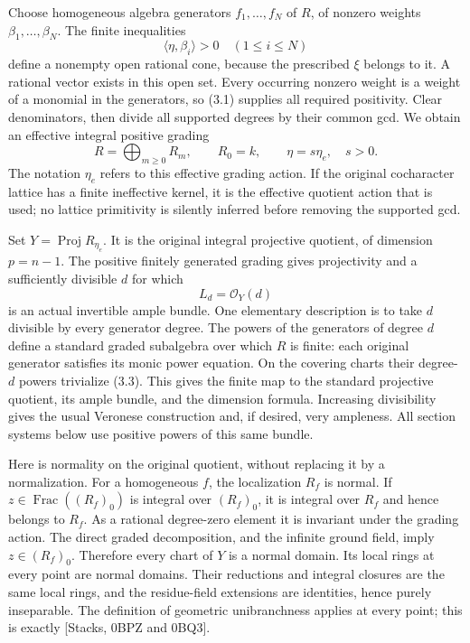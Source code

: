 \documentclass[
  10pt,
]{article}
\begin{document}
Choose homogeneous algebra generators \(f_1,\ldots,f_N\) of \(R\), of
nonzero weights \(\beta_1,\ldots,\beta_N\). The finite inequalities \[
                 \langle\eta,\beta_i\rangle>0\quad(1\leq i\leq N)
                                                               \tag{3.1}
\] define a nonempty open rational cone, because the prescribed \(\xi\)
belongs to it. A rational vector exists in this open set. Every
occurring nonzero weight is a weight of a monomial in the generators, so
(3.1) supplies all required positivity. Clear denominators, then divide
all supported degrees by their common gcd. We obtain an effective
integral positive grading \[
 R=\bigoplus_{m\geq0}R_m,\qquad R_0=k,\qquad
                     \eta=s\eta_e,\quad s>0.                    \tag{3.2}
\] The notation \(\eta_e\) refers to this effective grading action. If
the original cocharacter lattice has a finite ineffective kernel, it is
the effective quotient action that is used; no lattice primitivity is
silently inferred before removing the supported gcd.

Set \(Y=\operatorname{Proj}R_{\eta_e}\). It is the original integral
projective quotient, of dimension \(p=n-1\). The positive finitely
generated grading gives projectivity and a sufficiently divisible \(d\)
for which \[
                       L_d=\mathcal O_Y(d)                     \tag{3.3}
\] is an actual invertible ample bundle. One elementary description is
to take \(d\) divisible by every generator degree. The powers of the
generators of degree \(d\) define a standard graded subalgebra over
which \(R\) is finite: each original generator satisfies its monic power
equation. On the covering charts their degree-\(d\) powers trivialize
(3.3). This gives the finite map to the standard projective quotient,
its ample bundle, and the dimension formula. Increasing divisibility
gives the usual Veronese construction and, if desired, very ampleness.
All section systems below use positive powers of this same bundle.

Here is normality on the original quotient, without replacing it by a
normalization. For a homogeneous \(f\), the localization \(R_f\) is
normal. If \(z\in\operatorname{Frac}((R_f)_0)\) is integral over
\((R_f)_0\), it is integral over \(R_f\) and hence belongs to \(R_f\).
As a rational degree-zero element it is invariant under the grading
action. The direct graded decomposition, and the infinite ground field,
imply \(z\in(R_f)_0\). Therefore every chart of \(Y\) is a normal
domain. Its local rings at every point are normal domains. Their
reductions and integral closures are the same local rings, and the
residue-field extensions are identities, hence purely inseparable. The
definition of geometric unibranchness applies at every point; this is
exactly {[}Stacks, 0BPZ and 0BQ3{]}.
\end{document}
